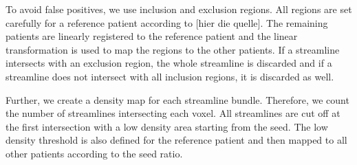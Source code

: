 To avoid false positives, we use inclusion and exclusion regions. All regions
are set carefully for a reference patient according to [hier die quelle].
The remaining patients are linearly registered to the reference patient and the
linear transformation is used to map the regions to the other patients. 
If a streamline intersects with an exclusion region, the whole streamline is
discarded and if a streamline does not intersect with all inclusion regions, it
is discarded as well. 

Further, we create a density map for each streamline
bundle. Therefore, we count the number of streamlines intersecting each voxel.
All streamlines are cut off at the first intersection with a low density
area starting from the seed. The low density threshold is also defined for the
reference patient and then mapped to all other patients according to the seed
ratio.

